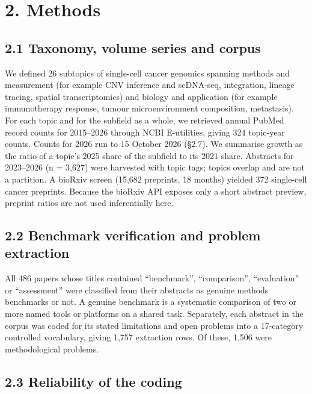 \documentclass[11pt]{article}
\begin{document}
\section{2. Methods}\label{methods}

\subsection{2.1 Taxonomy, volume series and corpus}\label{taxonomy-volume-series-and-corpus}

We defined 26 subtopics of single-cell cancer genomics spanning methods
and measurement (for example CNV inference and scDNA-seq, integration,
lineage tracing, spatial transcriptomics) and biology and application
(for example immunotherapy response, tumour microenvironment
composition, metastasis). For each topic and for the subfield as a
whole, we retrieved annual PubMed record counts for 2015--2026 through
NCBI E-utilities, giving 324 topic-year counts. Counts for 2026 run to
15 October 2026 (§2.7). We summarise growth as the ratio of a topic's
2025 share of the subfield to its 2021 share. Abstracts for 2023--2026
(n = 3,627) were harvested with topic tags; topics overlap and are not a
partition. A bioRxiv screen (15,682 preprints, 18 months) yielded 372
single-cell cancer preprints. Because the bioRxiv API exposes only a
short abstract preview, preprint ratios are not used inferentially here.

\subsection{2.2 Benchmark verification and problem extraction}\label{benchmark-verification-and-problem-extraction}

All 486 papers whose titles contained ``benchmark'', ``comparison'',
``evaluation'' or ``assessment'' were classified from their abstracts as
genuine methods benchmarks or not. A genuine benchmark is a systematic
comparison of two or more named tools or platforms on a shared task.
Separately, each abstract in the corpus was coded for its stated
limitations and open problems into a 17-category controlled vocabulary,
giving 1,757 extraction rows. Of these, 1,506 were methodological
problems.

\subsection{2.3 Reliability of the coding}\label{reliability-of-the-coding}
\end{document}
